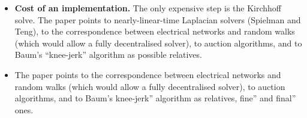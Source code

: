 \documentclass[11pt]{book}
\begin{document}
\begin{itemize}
\item \textbf{Cost of an implementation.} The only expensive step is the Kirchhoff solve. The paper points to nearly-linear-time Laplacian solvers (Spielman and Teng), to the correspondence between electrical networks and random walks (which would allow a fully decentralised solver), to auction algorithms, and to Baum's ``knee-jerk'' algorithm as possible relatives.
\item The paper points to the correspondence between electrical networks and random walks (which would allow a fully decentralised solver), to auction algorithms, and to Baum's knee-jerk'' algorithm as relatives, fine'' and final'' ones.
\end{itemize}
\end{document}
